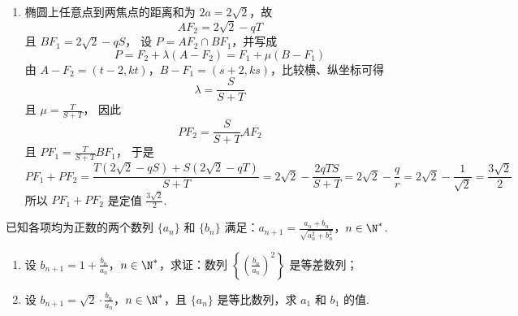 \begin{solution}
\begin{enumerate}
\begin{enumerate}
\item 椭圆上任意点到两焦点的距离和为 \(2a=2\sqrt{2}\)，故
\[
AF_{2}=2\sqrt{2}-qT
\]
且 \(BF_{1}=2\sqrt{2}-qS\)，
设 \(P=AF_{2}\cap BF_{1}\)，并写成
\[
P=F_{2}+\lambda(A-F_{2})=F_{1}+\mu(B-F_{1})
\]
由 \(A-F_{2}=(t-2,kt)\)，\(B-F_{1}=(s+2,ks)\)，比较横、纵坐标可得
\[
\lambda=\frac{S}{S+T}
\]
且 \(\mu=\frac{T}{S+T}\)，
因此
\[
PF_{2}=\frac{S}{S+T}AF_{2}
\]
且 \(PF_{1}=\frac{T}{S+T}BF_{1}\)，
于是
\[
PF_{1}+PF_{2}=\frac{T(2\sqrt{2}-qS)+S(2\sqrt{2}-qT)}{S+T}=2\sqrt{2}-\frac{2qTS}{S+T}=2\sqrt{2}-\frac{q}{r}=2\sqrt{2}-\frac{1}{\sqrt{2}}=\frac{3\sqrt{2}}{2}
\]
所以 \(PF_{1}+PF_{2}\) 是定值 \(\frac{3\sqrt{2}}{2}\).
\end{enumerate}
\end{enumerate}
\end{solution}

\begin{problem}
已知各项均为正数的两个数列 \(\{a_n\}\) 和 \(\{b_n\}\) 满足：\(a_{n+1} = \frac{a_n + b_n}{\sqrt{a_n^2 + b_n^2}}\)，\(n \in \N^*\).

\begin{enumerate}
\item 设 \(b_{n+1} = 1 + \frac{b_n}{a_n}\)，\(n \in \N^*\)，求证：数列 \(\left\{\left(\frac{b_n}{a_n}\right)^2\right\}\) 是等差数列；
\item 设 \(b_{n+1} = \sqrt{2} \cdot \frac{b_n}{a_n}\)，\(n \in \N^*\)，且 \(\{a_n\}\) 是等比数列，求 \(a_1\) 和 \(b_1\) 的值.
\end{enumerate}
\end{problem}

